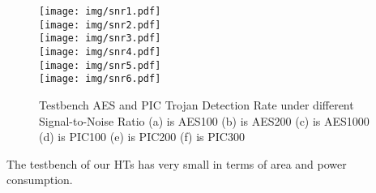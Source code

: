 \documentclass{beamer}
\begin{document}
\begin{columns}
\begin{column}[T]{0.33\textwidth}
\begin{figure}[h]
\begin{columns}
                        \texttt{[image: img/snr1.pdf]}\\
                        \texttt{[image: img/snr2.pdf]}\\
                        \texttt{[image: img/snr3.pdf]}\\
                        \texttt{[image: img/snr4.pdf]}\\
                        \texttt{[image: img/snr5.pdf]}\\
                        \texttt{[image: img/snr6.pdf]}\\
                    \end{columns}
                    \label{fig:snr}
                    \caption{
                        {\color{black}Testbench AES and PIC Trojan Detection Rate under different
                    Signal-to-Noise Ratio
                    (a) is AES100
                    (b) is AES200
                    (c) is AES1000
                    (d) is PIC100
                    (e) is PIC200
                    (f) is PIC300}
                    }
                    \vspace{-0.15in}
                \end{figure}
            The testbench of our HTs has very small in terms of area and power
            consumption.


\end{column}
\end{columns}
\end{document}
